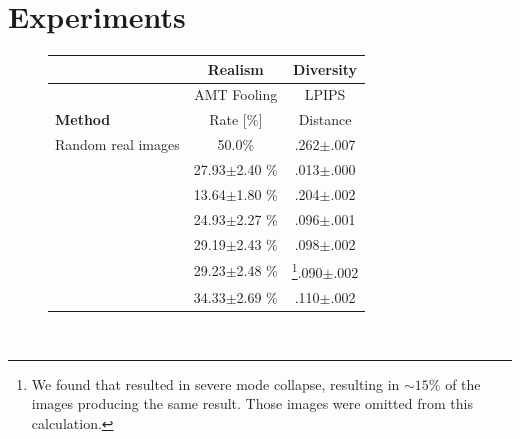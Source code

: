 \section{Experiments}
\label{sec:exp}
\begin{figure}
  \centering
  \begin{minipage}[b]{0.54\linewidth}  
  \scalebox{0.92} {
  \begin{tabular}{l c c}
	& \textbf{Realism} & \textbf{Diversity} \\ \hline
	& AMT Fooling & LPIPS \\
	\textbf{Method} & Rate [\%] & Distance \\ \hline
	Random real images & 50.0\% & .262$\pm$.007 \\ \hline
	\ppn~\citep{isola2016image} & 27.93$\pm$2.40 \% & .013$\pm$.000 \\
	\cae & 13.64$\pm$1.80 \% & .204$\pm$.002 \\
	\cvaegan & 24.93$\pm$2.27 \% & .096$\pm$.001 \\
	\cvaeganp & 29.19$\pm$2.43 \% & .098$\pm$.002 \\
	\cinfogan & 29.23$\pm$2.48 \% & \footnote{We found that \cinfogan resulted in severe mode collapse, resulting in $\sim15\%$ of the images producing the same result. Those images were omitted from this calculation.}.090$\pm$.002 \\
	\bicycle & 34.33$\pm$2.69 \% & .110$\pm$.002 \\ \hline
	\end{tabular} } \\
	

\end{minipage}
\end{figure}
